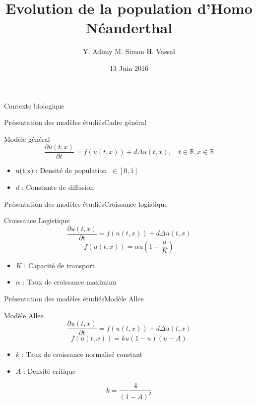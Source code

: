 \documentclass[10pt]{beamer}
\title[Population Néanderthal]{\textbf{Evolution de la population d'Homo Néanderthal}}
\author[Y. Adimy M. Simon H. Vassal]{Y. Adimy M. Simon H. Vassal}
\institute[]{INSA Lyon - Bioinformatique et Modélisation}
\date{13 Juin 2016}
\begin{document}

\begin{frame} 
   \titlepage
   \insertlogo
\end{frame}

\begin{frame}{Contexte biologique}{}
\end{frame}


\begin{frame}{Présentation des modèles étudiés}{Cadre général}
\begin{block}{Modèle général}
	\begin{equation}
		\frac{\partial u(t,x)}{\partial t}=f(u(t,x))+d\Delta u(t,x), \quad t \in \mathbb{R}, x \in \mathbb{R}
	\end{equation}
\end{block}
\begin{itemize}
	\item u(t,x) : Densité de population  $\ \in[0,1]$ 
    \item $d$ : Constante de diffusion 
\end{itemize}
\end{frame}

\begin{frame}{Présentation des modèles étudiés}{Croissance logistique}
\begin{block}{Croissance Logistique}
	$$\frac{\partial u(t,x)}{\partial t}=f(u(t,x))+d\Delta u(t,x)$$
	$$f(u(t,x))=\alpha u (1 - \dfrac{u}{K}) $$
\end{block}
\begin{itemize}
    \item $K$ : Capacité de transport 
    \item $\alpha$ : Taux de croissance maximum
\end{itemize}
\end{frame}

\begin{frame}{Présentation des modèles étudiés}{Modèle Allee}
\begin{block}{Modèle Allee}
	$$\frac{\partial u(t,x)}{\partial t}=f(u(t,x))+d\Delta u(t,x)$$
	$$f(u(t,x))=ku(1-u)(u-A)$$
\end{block}
\begin{itemize}
    \item $k$ : Taux de croissance normalisé constant 
    \item $A$ : Densité critique
\end{itemize}
$$k=\frac{4}{(1-A)^2}$$
\end{frame}
\end{document}
